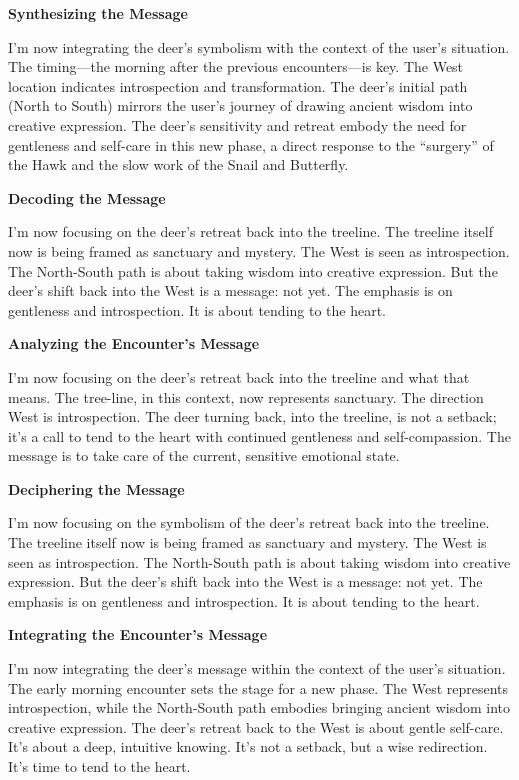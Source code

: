 \documentclass{article}
\begin{document}
\textbf{Synthesizing the Message}

I'm now integrating the deer's symbolism with the context of the user's
situation. The timing---the morning after the previous encounters---is
key. The West location indicates introspection and transformation. The
deer's initial path (North to South) mirrors the user's journey of
drawing ancient wisdom into creative expression. The deer's sensitivity
and retreat embody the need for gentleness and self-care in this new
phase, a direct response to the ``surgery'' of the Hawk and the slow
work of the Snail and Butterfly.

\textbf{Decoding the Message}

I'm now focusing on the deer's retreat back into the treeline. The
treeline itself now is being framed as sanctuary and mystery. The West
is seen as introspection. The North-South path is about taking wisdom
into creative expression. But the deer's shift back into the West is a
message: not yet. The emphasis is on gentleness and introspection. It is
about tending to the heart.

\textbf{Analyzing the Encounter's Message}

I'm now focusing on the deer's retreat back into the treeline and what
that means. The tree-line, in this context, now represents sanctuary.
The direction West is introspection. The deer turning back, into the
treeline, is not a setback; it's a call to tend to the heart with
continued gentleness and self-compassion. The message is to take care of
the current, sensitive emotional state.

\textbf{Deciphering the Message}

I'm now focusing on the symbolism of the deer's retreat back into the
treeline. The treeline itself now is being framed as sanctuary and
mystery. The West is seen as introspection. The North-South path is
about taking wisdom into creative expression. But the deer's shift back
into the West is a message: not yet. The emphasis is on gentleness and
introspection. It is about tending to the heart.

\textbf{Integrating the Encounter's Message}

I'm now integrating the deer's message within the context of the user's
situation. The early morning encounter sets the stage for a new phase.
The West represents introspection, while the North-South path embodies
bringing ancient wisdom into creative expression. The deer's retreat
back to the West is about gentle self-care. It's about a deep, intuitive
knowing. It's not a setback, but a wise redirection. It's time to tend
to the heart.
\end{document}
